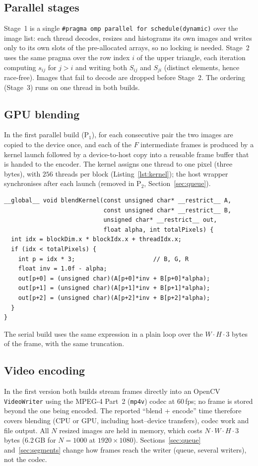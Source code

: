 \documentclass[conference]{IEEEtran}
\begin{document}
\subsection{Parallel stages}
Stage~1 is a single \texttt{\#pragma omp parallel for schedule(dynamic)} over the image list: each thread decodes, resizes and histograms its own images and writes only to its own slots of the pre-allocated arrays, so no locking is needed. Stage~2 uses the same pragma over the row index $i$ of the upper triangle, each iteration computing $s_{ij}$ for $j>i$ and writing both $S_{ij}$ and $S_{ji}$ (distinct elements, hence race-free). Images that fail to decode are dropped before Stage~2. The ordering (Stage~3) runs on one thread in both builds.

\subsection{GPU blending}
In the first parallel build (P$_1$), for each consecutive pair the two images are copied to the device once, and each of the $F$ intermediate frames is produced by a kernel launch followed by a device-to-host copy into a reusable frame buffer that is handed to the encoder. The kernel assigns one thread to one pixel (three bytes), with $256$ threads per block (Listing~\ref{lst:kernel}); the host wrapper synchronises after each launch (removed in P$_2$, Section~\ref{sec:queue}).

\begin{lstlisting}[caption={CUDA blend kernel (Eq.~\eqref{eq:blend}).},label={lst:kernel},float=t]
__global__ void blendKernel(const unsigned char* __restrict__ A,
                            const unsigned char* __restrict__ B,
                            unsigned char* __restrict__ out,
                            float alpha, int totalPixels) {
  int idx = blockDim.x * blockIdx.x + threadIdx.x;
  if (idx < totalPixels) {
    int p = idx * 3;                      // B, G, R
    float inv = 1.0f - alpha;
    out[p+0] = (unsigned char)(A[p+0]*inv + B[p+0]*alpha);
    out[p+1] = (unsigned char)(A[p+1]*inv + B[p+1]*alpha);
    out[p+2] = (unsigned char)(A[p+2]*inv + B[p+2]*alpha);
  }
}
\end{lstlisting}

The serial build uses the same expression in a plain loop over the $W\cdot H\cdot 3$ bytes of the frame, with the same truncation.

\subsection{Video encoding}
In the first version both builds stream frames directly into an OpenCV \texttt{VideoWriter} using the MPEG-4 Part~2 (\texttt{mp4v}) codec at $60$\,fps; no frame is stored beyond the one being encoded. The reported ``blend + encode'' time therefore covers blending (CPU or GPU, including host--device transfers), codec work and file output. All $N$ resized images are held in memory, which costs $N\cdot W\cdot H\cdot 3$ bytes (6.2\,GB for $N{=}1000$ at $1920\times1080$). Sections~\ref{sec:queue} and~\ref{sec:segments} change how frames reach the writer (queue, several writers), not the codec.
\end{document}
